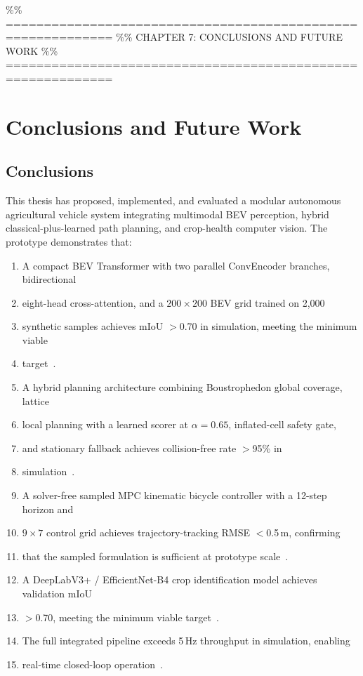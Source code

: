 \documentclass[12pt, a4paper]{article}
\begin{document}
\%\% ============================================================
\%\% CHAPTER 7: CONCLUSIONS AND FUTURE WORK
\%\% ============================================================
\chapter{Conclusions and Future Work}
\label{ch:conclusions}

\section{Conclusions}

This thesis has proposed, implemented, and evaluated a modular autonomous agricultural
vehicle system integrating multimodal BEV perception, hybrid classical-plus-learned path
planning, and crop-health computer vision. The prototype demonstrates that:

\begin{enumerate}
  \item A compact BEV Transformer with two parallel ConvEncoder branches, bidirectional
  \item eight-head cross-attention, and a $200\!\times\!200$ BEV grid trained on 2,000
  \item synthetic samples achieves mIoU $>$0.70 in simulation, meeting the minimum viable
  \item target~\cite{ref233, ref234}.
  \item A hybrid planning architecture combining Boustrophedon global coverage, lattice
  \item local planning with a learned scorer at $\alpha\!=\!0.65$, inflated-cell safety gate,
  \item and stationary fallback achieves collision-free rate $>$95\% in
  \item simulation~\cite{ref234}.
  \item A solver-free sampled MPC kinematic bicycle controller with a 12-step horizon and
  \item $9\!\times\!7$ control grid achieves trajectory-tracking RMSE $<$0.5\,m, confirming
  \item that the sampled formulation is sufficient at prototype scale~\cite{ref234}.
  \item A DeepLabV3+ / EfficientNet-B4 crop identification model achieves validation mIoU
  \item $>$0.70, meeting the minimum viable target~\cite{ref233, ref234}.
  \item The full integrated pipeline exceeds 5\,Hz throughput in simulation, enabling
  \item real-time closed-loop operation~\cite{ref233, ref234}.
\end{enumerate}
\end{document}
